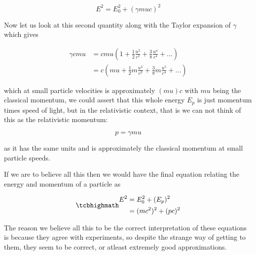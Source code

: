 \begin{equation}
	E^2 = E_0^2 + (\gamma{m}{u}{c})^2
\end{equation}

Now let us look at this second quantity along with the Taylor expansion of $\gamma$ which gives

\begin{equation}
	\begin{aligned}
		\gamma {c}{m}{u} & = {c}{m}{u} \left(1 + \frac{1}{2}\frac{u^2}{{c}^2} + \frac{3}{8}\frac{u^4}{c^4} + ...
		\right)                                                                                                   \\
		                 & ={c}\left( {m}{u} + \frac{1}{2}m \frac{u^3}{{c}^2} + \frac{3}{8}m\frac{u^5}{c^4} + ...
		\right)
	\end{aligned}
\end{equation}

which at small particle velocities is approximately $({m}{u}){c}$ with ${m}{u}$ being the classical momentum, we could assert that this whole energy $E_p$ is just momentum times speed of light, but in the relativistic context, that is we can not think of this as the relativistic momentum:

\begin{equation}
	p = \gamma {m}{u}
\end{equation}

as it has the same units and is approximately the classical momentum at small particle speeds.

If we are to believe all this then we would have the final equation relating the energy and momentum of a particle as

\begin{equation}
	\mhl{
		\begin{aligned}
			E^2 & = E_0^2 + (E_p)^2   \\
			    & = (mc^2)^2 + (pc)^2
		\end{aligned}
	}
\end{equation}

The reason we believe all this to be the correct interpretation of these equations is because they agree with experiments, so despite the strange way of getting to them, they seem to be correct, or atleast extremely good approximations.


